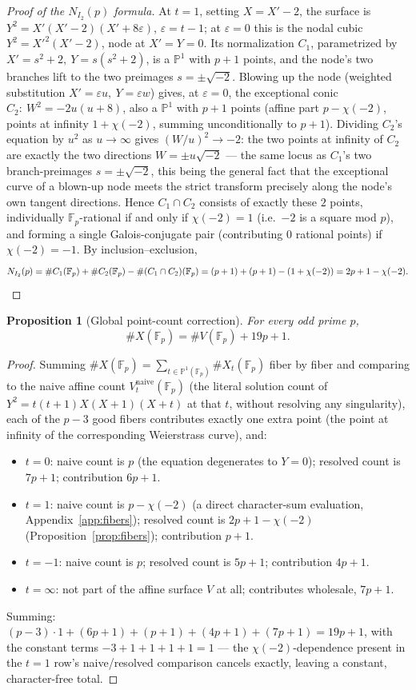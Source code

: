 \documentclass[11pt]{amsart}
\newtheorem{proposition}[theorem]{Proposition}
\theoremstyle{definition}
\newcommand{\Fp}{\mathbb{F}_p}
\begin{document}
\begin{proof}[Proof of the $N_{I_2}(p)$ formula]
At $t=1$, setting $X=X'-2$, the surface is $Y^2=X'(X'-2)(X'+8\varepsilon)$, $\varepsilon=t-1$; at $\varepsilon=0$ this is the nodal cubic $Y^2=X'^2(X'-2)$, node at $X'=Y=0$. Its normalization $C_1$, parametrized by $X'=s^2+2,\ Y=s(s^2+2)$, is a $\mathbb P^1$ with $p+1$ points, and the node's two branches lift to the two preimages $s=\pm\sqrt{-2}$. Blowing up the node (weighted substitution $X'=\varepsilon u,\ Y=\varepsilon w$) gives, at $\varepsilon=0$, the exceptional conic $C_2:\ W^2=-2u(u+8)$, also a $\mathbb P^1$ with $p+1$ points (affine part $p-\chi(-2)$, points at infinity $1+\chi(-2)$, summing unconditionally to $p+1$). Dividing $C_2$'s equation by $u^2$ as $u\to\infty$ gives $(W/u)^2\to-2$: the two points at infinity of $C_2$ are exactly the two directions $W=\pm u\sqrt{-2}$ — the same locus as $C_1$'s two branch-preimages $s=\pm\sqrt{-2}$, this being the general fact that the exceptional curve of a blown-up node meets the strict transform precisely along the node's own tangent directions. Hence $C_1\cap C_2$ consists of exactly these $2$ points, individually $\Fp$-rational if and only if $\chi(-2)=1$ (i.e.\ $-2$ is a square mod $p$), and forming a single Galois-conjugate pair (contributing $0$ rational points) if $\chi(-2)=-1$. By inclusion--exclusion,
\[
N_{I_2}(p)=\#C_1(\Fp)+\#C_2(\Fp)-\#(C_1\cap C_2)(\Fp)=(p+1)+(p+1)-(1+\chi(-2))=2p+1-\chi(-2).\qedhere
\]
\end{proof}

\begin{proposition}[Global point-count correction]
\label{prop:ledger}
For every odd prime $p$,
\[
\boxed{\#X(\Fp)=\#V(\Fp)+19p+1.}
\]
\end{proposition}

\begin{proof}
Summing $\#X(\Fp)=\sum_{t\in\mathbb P^1(\Fp)}\#X_t(\Fp)$ fiber by fiber and comparing to the naive affine count $V_t^{\mathrm{naive}}(\Fp)$ (the literal solution count of $Y^2=t(t+1)X(X+1)(X+t)$ at that $t$, without resolving any singularity), each of the $p-3$ good fibers contributes exactly one extra point (the point at infinity of the corresponding Weierstrass curve), and:
\begin{itemize}
\item $t=0$: naive count is $p$ (the equation degenerates to $Y=0$); resolved count is $7p+1$; contribution $6p+1$.
\item $t=1$: naive count is $p-\chi(-2)$ (a direct character-sum evaluation, Appendix~\ref{app:fibers}); resolved count is $2p+1-\chi(-2)$ (Proposition~\ref{prop:fibers}); contribution $p+1$.
\item $t=-1$: naive count is $p$; resolved count is $5p+1$; contribution $4p+1$.
\item $t=\infty$: not part of the affine surface $V$ at all; contributes wholesale, $7p+1$.
\end{itemize}
Summing: $(p-3)\cdot1+(6p+1)+(p+1)+(4p+1)+(7p+1)=19p+1$, with the constant terms $-3+1+1+1+1=1$ — the $\chi(-2)$-dependence present in the $t=1$ row's naive/resolved comparison cancels exactly, leaving a constant, character-free total.
\end{proof}
\end{document}
